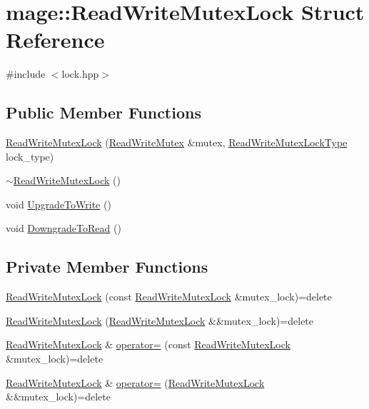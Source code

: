 \hypertarget{structmage_1_1_read_write_mutex_lock}{}\section{mage\+:\+:Read\+Write\+Mutex\+Lock Struct Reference}
\label{structmage_1_1_read_write_mutex_lock}


{\ttfamily \#include $<$lock.\+hpp$>$}

\subsection*{Public Member Functions}
\begin{DoxyCompactItemize}
\item 
\hyperlink{structmage_1_1_read_write_mutex_lock_a323e2f45646caa23c4ee21452c8f8d4a}{Read\+Write\+Mutex\+Lock} (\hyperlink{classmage_1_1_read_write_mutex}{Read\+Write\+Mutex} \&mutex, \hyperlink{namespacemage_afd76fcca37ce5c5b2227671290973c74}{Read\+Write\+Mutex\+Lock\+Type} lock\+\_\+type)
\item 
\hyperlink{structmage_1_1_read_write_mutex_lock_a64b600234d29ba7307fcd77a17486582}{$\sim$\+Read\+Write\+Mutex\+Lock} ()
\item 
void \hyperlink{structmage_1_1_read_write_mutex_lock_a01843784e8dbf0d3dfd6100562f699be}{Upgrade\+To\+Write} ()
\item 
void \hyperlink{structmage_1_1_read_write_mutex_lock_ad3292e579d09107c7361989657b9bade}{Downgrade\+To\+Read} ()
\end{DoxyCompactItemize}
\subsection*{Private Member Functions}
\begin{DoxyCompactItemize}
\item 
\hyperlink{structmage_1_1_read_write_mutex_lock_a2c9cd6329bfd18c4752235ebee7edb4a}{Read\+Write\+Mutex\+Lock} (const \hyperlink{structmage_1_1_read_write_mutex_lock}{Read\+Write\+Mutex\+Lock} \&mutex\+\_\+lock)=delete
\item 
\hyperlink{structmage_1_1_read_write_mutex_lock_ac1da0fa4a15d3dcae7a15ac3a8dcc8f9}{Read\+Write\+Mutex\+Lock} (\hyperlink{structmage_1_1_read_write_mutex_lock}{Read\+Write\+Mutex\+Lock} \&\&mutex\+\_\+lock)=delete
\item 
\hyperlink{structmage_1_1_read_write_mutex_lock}{Read\+Write\+Mutex\+Lock} \& \hyperlink{structmage_1_1_read_write_mutex_lock_ade82a57f337e39a1515f67fbc1f6fc43}{operator=} (const \hyperlink{structmage_1_1_read_write_mutex_lock}{Read\+Write\+Mutex\+Lock} \&mutex\+\_\+lock)=delete
\item 
\hyperlink{structmage_1_1_read_write_mutex_lock}{Read\+Write\+Mutex\+Lock} \& \hyperlink{structmage_1_1_read_write_mutex_lock_a0c31334330a9259b0b68d71b9ee13704}{operator=} (\hyperlink{structmage_1_1_read_write_mutex_lock}{Read\+Write\+Mutex\+Lock} \&\&mutex\+\_\+lock)=delete
\end{DoxyCompactItemize}
